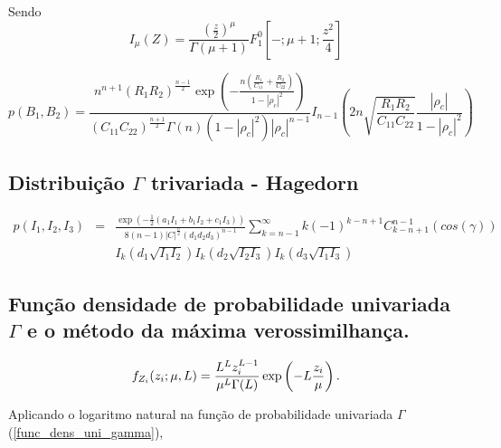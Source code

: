 \documentclass[journal,article,submit,moreauthors,pdftex]{Definitions/mdpi}
\begin{document}
Sendo
\begin{equation}\label{eqn61}
	I_{\mu}(Z)=\frac{(\frac{z}{2})^{\mu}}{\Gamma(\mu+1)} F_{1}^{0}[-;\mu+1;\frac{z^2}{4}]
\end{equation}

\begin{equation}\label{eqn62}
	p(B_1,B_2)=\frac{n^{n+1}\left(R_1R_2\right)^{\frac{n-1}{2}}\exp\left(-\frac{n(\frac{R_1}{C_{11}}+\frac{R_2}{C_{22}})}{1-|\rho_c|^2}\right)}{(C_{11}C_{22})^{\frac{n+1}{2}}\Gamma(n)(1-|\rho_c|^2)|\rho_c|^{n-1}}I_{n-1}\left(2n\sqrt{\frac{R_1R_2}{C_{11}C_{22}}}\frac{|\rho_c|}{1-|\rho_c|^2}\right)
\end{equation}
\subsection{Distribuição $\Gamma$ trivariada - Hagedorn }
\begin{equation}\label{eqn62}
\begin{array}{ccc}
	p(I_1,I_2,I_3)&=& \frac{\exp(-\frac{1}{2}(a_1I_1+b_1I_2+c_1I_3))}{8(n-1)|C|^{\frac{n}{2}}(d_1d_2d_3)^{n-1}}\sum_{k=n-1}^{\infty}k(-1)^{k-n+1}C_{k-n+1}^{n-1}(cos(\gamma))\\
	&&I_k(d_1\sqrt{I_1I_2})I_k(d_2\sqrt{I_2I_3})I_k(d_3\sqrt{I_1I_3})
\end{array}
\end{equation}
\subsection{Função densidade de probabilidade univariada $\Gamma$ e o método da máxima verossimilhança.}
\begin{equation}\label{func_dens_uni_gamma}
	f_{Z_{i}}(z_{i};\mu,L)=\frac{L^{L}z_{i}^{L-1}}{\mu^{L}\Gamma(L)} \exp\left(-L\frac{z_{i}}{\mu}\right). \\
\end{equation}

Aplicando o logaritmo natural na função de probabilidade univariada $\Gamma$ (\ref{func_dens_uni_gamma}),
\end{document}
